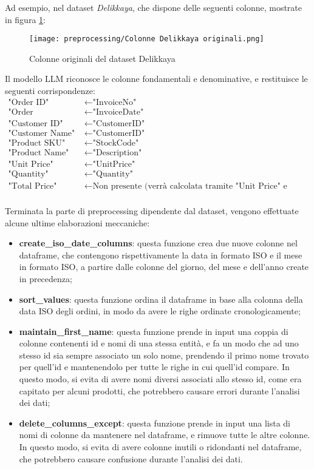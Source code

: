Ad esempio, nel dataset \emph{Delikkaya}, che dispone delle seguenti colonne, mostrate in figura \ref{fig:columns-delikkaya-original}:
\begin{figure}[h]
    \centering
    \texttt{[image: preprocessing/Colonne Delikkaya originali.png]}
    \caption{Colonne originali del dataset Delikkaya}
    \label{fig:columns-delikkaya-original}
\end{figure}

Il modello LLM riconosce le colonne fondamentali e denominative, e restituisce le seguenti corrispondenze:
\begin{align*}
\text{"Order ID"} &\leftarrow \text{"InvoiceNo"} \\
\text{"Order Timestamp"} &\leftarrow \text{"InvoiceDate"} \\
\text{"Customer ID"} &\leftarrow \text{"CustomerID"} \\
\text{"Customer Name"} &\leftarrow \text{"CustomerID"} \\
\text{"Product SKU"} &\leftarrow \text{"StockCode"} \\
\text{"Product Name"} &\leftarrow \text{"Description"} \\
\text{"Unit Price"} &\leftarrow \text{"UnitPrice"} \\
\text{"Quantity"} &\leftarrow \text{"Quantity"} \\
\text{"Total Price"} &\leftarrow \text{Non presente (verrà calcolata tramite "Unit Price" e "Quantity")} \\
\end{align*}

Terminata la parte di preprocessing dipendente dal dataset, vengono effettuate alcune ultime elaborazioni meccaniche:
\begin{itemize}
    \item \textbf{create\_iso\_date\_columns}: questa funzione crea due nuove colonne nel dataframe, che contengono rispettivamente la data in formato ISO e il mese in formato ISO, a partire dalle colonne del giorno, del mese e dell'anno create in precedenza;
    \item \textbf{sort\_values}: questa funzione ordina il dataframe in base alla colonna della data ISO degli ordini, in modo da avere le righe ordinate cronologicamente;
    \item \textbf{maintain\_first\_name}: questa funzione prende in input una coppia di colonne contenenti id e nomi di una stessa entità, e fa un modo che ad uno stesso id sia sempre associato un solo nome, prendendo il primo nome trovato per quell'id e mantenendolo per tutte le righe in cui quell'id compare. In questo modo, si evita di avere nomi diversi associati allo stesso id, come era capitato per alcuni prodotti, che potrebbero causare errori durante l'analisi dei dati;
    \item \textbf{delete\_columns\_except}: questa funzione prende in input una lista di nomi di colonne da mantenere nel dataframe, e rimuove tutte le altre colonne. In questo modo, si evita di avere colonne inutili o ridondanti nel dataframe, che potrebbero causare confusione durante l'analisi dei dati.
\end{itemize}

